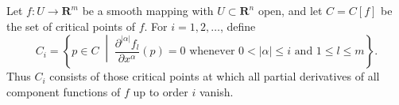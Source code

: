 Let $f: U \to \mathbf{R}^m$ be a smooth mapping with $U \subset \mathbf{R}^n$ open, and let $C = C[f]$ be the set of critical points of $f$. For $i = 1, 2, \ldots$, define
$$C_i = \left\{ p \in C \;\middle|\; \frac{\partial^{|\alpha|} f_l}{\partial x^\alpha}(p) = 0 \text{ whenever } 0 < |\alpha| \leq i \text{ and } 1 \leq l \leq m \right\}.$$
Thus $C_i$ consists of those critical points at which all partial derivatives of all component functions of $f$ up to order $i$ vanish.
